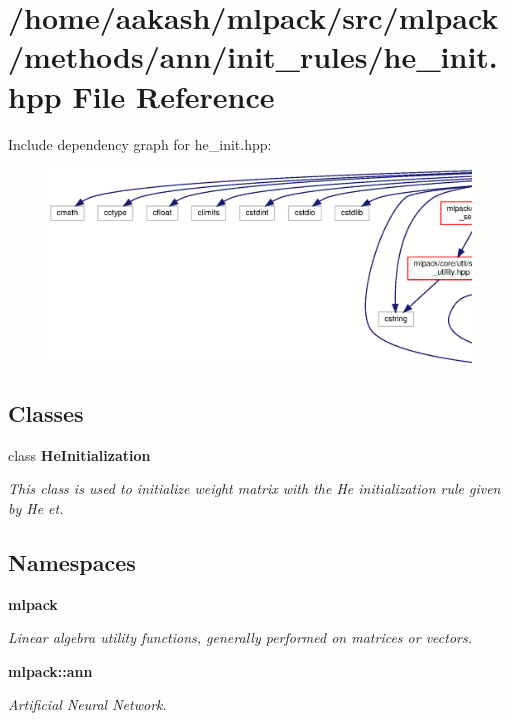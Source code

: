 \section{/home/aakash/mlpack/src/mlpack/methods/ann/init\+\_\+rules/he\+\_\+init.hpp File Reference}
\label{he__init_8hpp}
Include dependency graph for he\+\_\+init.\+hpp\+:
\nopagebreak
\begin{figure}[H]
\begin{center}
\leavevmode
\includegraphics[width=350pt]{he__init_8hpp__incl}
\end{center}
\end{figure}
\subsection*{Classes}
\begin{DoxyCompactItemize}
\item 
class \textbf{ He\+Initialization}
\begin{DoxyCompactList}\small\item\em This class is used to initialize weight matrix with the He initialization rule given by He et. \end{DoxyCompactList}\end{DoxyCompactItemize}
\subsection*{Namespaces}
\begin{DoxyCompactItemize}
\item 
 \textbf{ mlpack}
\begin{DoxyCompactList}\small\item\em Linear algebra utility functions, generally performed on matrices or vectors. \end{DoxyCompactList}\item 
 \textbf{ mlpack\+::ann}
\begin{DoxyCompactList}\small\item\em Artificial Neural Network. \end{DoxyCompactList}\end{DoxyCompactItemize}



